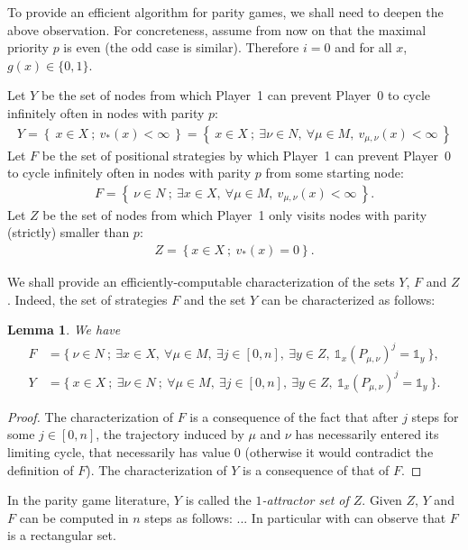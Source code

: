 \documentclass{article}
\newtheorem{lemma}{Lemma}
\def\1{{\mathds 1}}
\def\pa{Player~0}
\def\pb{Player~1}
\begin{document}
To provide an efficient algorithm for parity games, we shall need to deepen the above observation.
For concreteness, assume from now on that the maximal priority $p$ is even (the odd case is similar). Therefore $i=0$ and for all $x$, $g(x) \in \{0,1\}$.

Let $Y$ be the set of nodes from which \pb{ }can prevent \pa{ }to cycle infinitely often in nodes with parity $p$:
\begin{align}
Y = \left\{~ x \in X~;~  v_*(x)<\infty  ~\right\} = \left\{~ x \in X~;~  \exists \nu \in N,~ \forall \mu \in M,~ v_{\mu,\nu}(x)<\infty  ~\right\}
\end{align}
Let $F$ be the set of positional strategies by which \pb{ }can prevent \pa{ }to cycle infinitely often in nodes with parity $p$ from some starting node:
\begin{align}
F = \left\{~ \nu \in N ~;~ \exists x \in X,~ \forall \mu \in M,~ v_{\mu,\nu}(x)<\infty ~\right\}.
\end{align}
Let $Z$ be the set of nodes from which \pb{ }only visits nodes with parity (strictly) smaller than $p$:
\begin{align}
Z = \left\{ x \in X~;~ v_*(x)=0  \right\}.
\end{align}

We shall provide an efficiently-computable characterization of the sets $Y$, $F$ and $Z$.
Indeed, the set of strategies $F$ and the set $Y$ can be characterized as follows:
\begin{lemma}
  We have
  \begin{align}
    F &= \{~ \nu \in N ~;~ \exists x \in X,~ \forall \mu \in M,~ \exists j \in [0,n],~ \exists y \in Z,~ \1_x (P_{\mu,\nu})^j = \1_y ~\},\\
    Y & = \{~ x \in X~;~ \exists \nu \in N ~;~ \forall \mu \in M,~ \exists j \in [0,n],~ \exists y \in Z,~ \1_x(P_{\mu,\nu})^j = \1_y ~\}.
  \end{align}
\end{lemma}
\begin{proof}
  The characterization of $F$ is a consequence of the fact that after $j$ steps for some $j \in [0,n]$, the trajectory induced by $\mu$ and $\nu$ has necessarily entered its limiting cycle, that necessarily has value 0 (otherwise it would contradict the definition of $F$). The characterization of $Y$ is a consequence of that of $F$.
\end{proof}
In the parity game literature, $Y$ is called the \emph{$1$-attractor set of $Z$}. Given $Z$, $Y$ and $F$ can be computed in $n$ steps as follows:
...
In particular with can observe that $F$ is a rectangular set.
\end{document}
